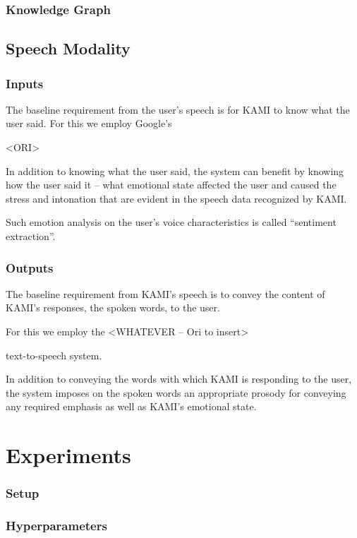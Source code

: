 \documentclass[11pt,a4paper]{article}
\begin{document}
\subsubsection{Knowledge Graph} %



\subsection{Speech Modality}

\subsubsection{Inputs}
The baseline requirement from the user’s speech is for KAMI to know what the user
said. For this we employ Google’s 

<ORI> 

In addition to knowing what the user said, the system can benefit by knowing how the
user said it – what emotional state affected the user and caused the stress and intonation
that are evident in the speech data recognized by KAMI. 

Such emotion analysis on the
user’s voice characteristics is called “sentiment extraction”.


\subsubsection{Outputs}
The baseline requirement from KAMI’s speech is to convey the content of KAMI’s
responses, the spoken words, to the user. 

For this we employ the 
<WHATEVER – Ori to insert> 

text-to-speech system. 

In addition to conveying the words with which KAMI
is responding to the user, the system imposes on the spoken words an appropriate
prosody for conveying any required emphasis as well as KAMI’s emotional state.

\section{Experiments}
\subsubsection{Setup}

\subsubsection{Hyperparameters}
\end{document}
